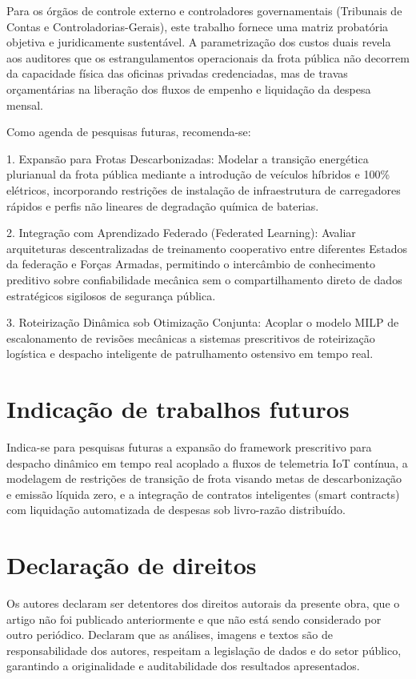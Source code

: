 \documentclass[12pt,a4paper]{article}
\begin{document}
Para os órgãos de controle externo e controladores governamentais (Tribunais de Contas e Controladorias-Gerais), este trabalho fornece uma matriz probatória objetiva e juridicamente sustentável. A parametrização dos custos duais revela aos auditores que os estrangulamentos operacionais da frota pública não decorrem da capacidade física das oficinas privadas credenciadas, mas de travas orçamentárias na liberação dos fluxos de empenho e liquidação da despesa mensal.

Como agenda de pesquisas futuras, recomenda-se:

1. Expansão para Frotas Descarbonizadas: Modelar a transição energética plurianual da frota pública mediante a introdução de veículos híbridos e 100\% elétricos, incorporando restrições de instalação de infraestrutura de carregadores rápidos e perfis não lineares de degradação química de baterias.

2. Integração com Aprendizado Federado (Federated Learning): Avaliar arquiteturas descentralizadas de treinamento cooperativo entre diferentes Estados da federação e Forças Armadas, permitindo o intercâmbio de conhecimento preditivo sobre confiabilidade mecânica sem o compartilhamento direto de dados estratégicos sigilosos de segurança pública.

3. Roteirização Dinâmica sob Otimização Conjunta: Acoplar o modelo MILP de escalonamento de revisões mecânicas a sistemas prescritivos de roteirização logística e despacho inteligente de patrulhamento ostensivo em tempo real.


\section{Indicação de trabalhos futuros}

Indica-se para pesquisas futuras a expansão do framework prescritivo para despacho dinâmico em tempo real acoplado a fluxos de telemetria IoT contínua, a modelagem de restrições de transição de frota visando metas de descarbonização e emissão líquida zero, e a integração de contratos inteligentes (smart contracts) com liquidação automatizada de despesas sob livro-razão distribuído.


\section{Declaração de direitos}

Os autores declaram ser detentores dos direitos autorais da presente obra, que o artigo não foi publicado anteriormente e que não está sendo considerado por outro periódico. Declaram que as análises, imagens e textos são de responsabilidade dos autores, respeitam a legislação de dados e do setor público, garantindo a originalidade e auditabilidade dos resultados apresentados.
\end{document}

